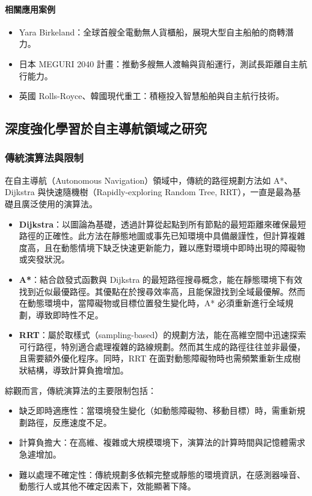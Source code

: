 \documentclass[12pt,a4paper]{ctexart}
\begin{document}
\paragraph{相關應用案例}
\begin{itemize}
  \item Yara Birkeland：全球首艘全電動無人貨櫃船，展現大型自主船舶的商轉潛力。
  \item 日本 MEGURI 2040 計畫：推動多艘無人渡輪與貨船運行，測試長距離自主航行能力。
  \item 英國 Rolls-Royce、韓國現代重工：積極投入智慧船舶與自主航行技術。
\end{itemize}

\subsection{深度強化學習於自主導航領域之研究}

\subsubsection{傳統演算法與限制}
在自主導航（Autonomous Navigation）領域中，傳統的路徑規劃方法如 A*、Dijkstra 與快速隨機樹（Rapidly-exploring Random Tree, RRT），一直是最為基礎且廣泛使用的演算法。

\begin{itemize}
  \item \textbf{Dijkstra}：以圖論為基礎，透過計算從起點到所有節點的最短距離來確保最短路徑的正確性。此方法在靜態地圖或事先已知環境中具備嚴謹性，但計算複雜度高，且在動態情境下缺乏快速更新能力，難以應對環境中即時出現的障礙物或突發狀況。
  \item \textbf{A*}：結合啟發式函數與 Dijkstra 的最短路徑搜尋概念，能在靜態環境下有效找到近似最優路徑。其優點在於搜尋效率高，且能保證找到全域最優解。然而在動態環境中，當障礙物或目標位置發生變化時，A* 必須重新進行全域規劃，導致即時性不足。
  \item \textbf{RRT}：屬於取樣式（sampling-based）的規劃方法，能在高維空間中迅速探索可行路徑，特別適合處理複雜的路線規劃。然而其生成的路徑往往並非最優，且需要額外優化程序。同時，RRT 在面對動態障礙物時也需頻繁重新生成樹狀結構，導致計算負擔增加。
\end{itemize}

\noindent 綜觀而言，傳統演算法的主要限制包括：
\begin{itemize}
  \item 缺乏即時適應性：當環境發生變化（如動態障礙物、移動目標）時，需重新規劃路徑，反應速度不足。
  \item 計算負擔大：在高維、複雜或大規模環境下，演算法的計算時間與記憶體需求急遽增加。
  \item 難以處理不確定性：傳統規劃多依賴完整或靜態的環境資訊，在感測器噪音、動態行人或其他不確定因素下，效能顯著下降。
\end{itemize}
\end{document}
